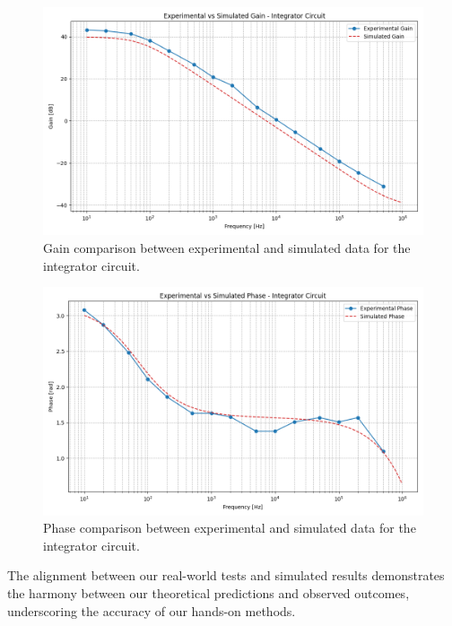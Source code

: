 		\begin{figure}[H]
		    \centering
		    \includegraphics[width=1\textwidth]{figures/integrator/gain_plot.png}
		    \caption{Gain comparison between experimental and simulated data for the integrator circuit.}
		    \label{fig:integrator_gain}
		\end{figure}

		\begin{figure}[H]
		    \centering
		    \includegraphics[width=1\textwidth]{figures/integrator/phase_plot.png}
		    \caption{Phase comparison between experimental and simulated data for the integrator circuit.}
		    \label{fig:integrator_phase}
		\end{figure} 

		The alignment between our real-world tests and simulated results demonstrates the harmony between our theoretical predictions and observed outcomes, underscoring the accuracy of our hands-on methods.
